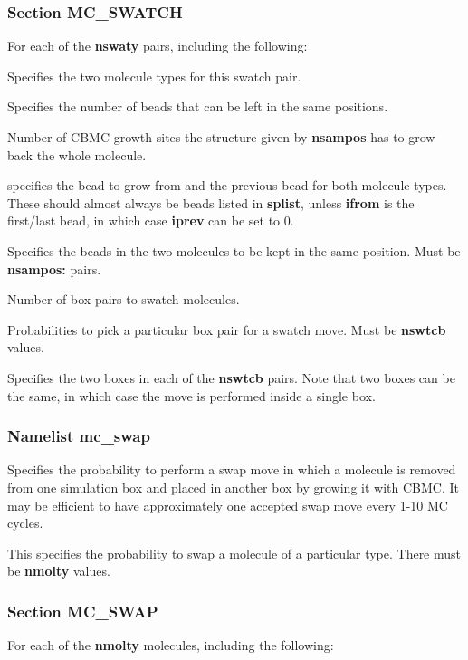 \documentclass[12pt,letterpaper]{article}
\begin{document}
\subsubsection{Section \textbf{MC\_SWATCH}}
For each of the \textbf{nswaty} pairs, including the
following:

 Specifies the two molecule types for this swatch pair.

 Specifies the number of beads that
can be left in the same positions.

 Number of CBMC growth sites the
structure given by {\bf nsampos} has to grow back the whole
molecule.

 specifies the bead
to grow from and the previous bead for both molecule types.
These should almost always be beads listed in {\bf splist},
unless {\bf ifrom} is the first/last bead, in which case
{\bf iprev} can be set to 0.

 Specifies the beads in the two
molecules to be kept in the same position. Must be {\bf
  nsampos:} pairs.

 Number of box pairs to swatch molecules.

 Probabilities to pick a particular
box pair for a swatch move. Must be {\bf nswtcb} values.

 Specifies the two boxes in each
of the {\bf nswtcb} pairs. Note that two boxes can be the
same, in which case the move is performed inside a single
box.

\subsubsection{Namelist \textbf{mc\_swap}}
 Specifies the probability to perform
a swap move in which a molecule is removed from one
simulation box and placed in another box by growing it with
CBMC. It may be efficient to have approximately one accepted
swap move every 1-10 MC cycles.

 This specifies the probability to
swap a molecule of a particular type. There must be {\bf
  nmolty} values.

\subsubsection{Section \textbf{MC\_SWAP}}
For each of the \textbf{nmolty} molecules, including the following:
\end{document}
